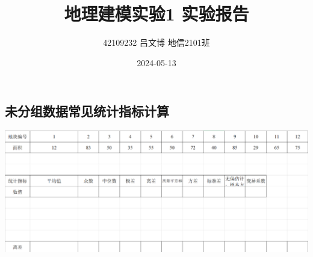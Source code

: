 \documentclass[
]{article}
\title{地理建模实验1 实验报告}
\author{42109232 \quad 吕文博 \quad 地信2101班}
\date{2024-05-13}
\begin{document}
\maketitle

\subsection{未分组数据常见统计指标计算}\label{ux672aux5206ux7ec4ux6570ux636eux5e38ux89c1ux7edfux8ba1ux6307ux6807ux8ba1ux7b97}

\includegraphics{../picture/exp1-1.png}
\end{document}
